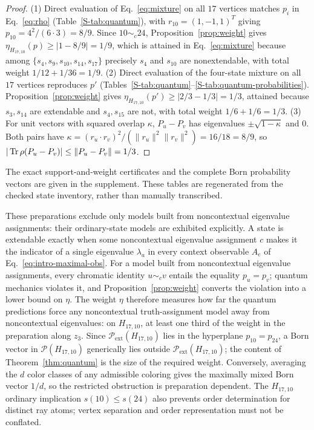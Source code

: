 \documentclass[aps,pra,reprint,superscriptaddress,longbibliography,nofootinbib,floatfix,10pt]{revtex4-2}
\theoremstyle{definition}\newtheorem{definition}[theorem]{Definition}
\theoremstyle{remark}\newtheorem{remark}[theorem]{Remark}
\begin{document}
\begin{proof}
(1) Direct evaluation of Eq.~\eqref{eq:mixture} on all $17$ vertices matches $p_i$ in Eq.~\eqref{eq:rho} (Table~\ref{S-tab:quantum}), with $r_{10}=(1,-1,1)^T$ giving $p_{10}=4^2/(6\cdot3)=8/9$. Since $10\sim_c 24$, Proposition~\ref{prop:weight} gives $\eta_{H_{17,10}}(p)\ge|1-8/9|=1/9$, which is attained in Eq.~\eqref{eq:mixture} because among $\{s_4,s_9,s_{10},s_{14},s_{17}\}$ precisely $s_4$ and $s_{10}$ are nonextendable, with total weight $1/12+1/36=1/9$. (2) Direct evaluation of the four-state mixture on all $17$ vertices reproduces $p'$ (Tables~\ref{S-tab:quantum}--\ref{S-tab:quantum-probabilities}). Proposition~\ref{prop:weight} gives $\eta_{H_{17,10}}(p')\ge|2/3-1/3|=1/3$, attained because $s_3,s_{14}$ are extendable and $s_4,s_{15}$ are not, with total weight $1/6+1/6=1/3$. (3) For unit vectors with squared overlap $\kappa$, $P_u-P_v$ has eigenvalues $\pm\sqrt{1-\kappa}$ and $0$. Both pairs have $\kappa=(r_u\cdot r_v)^2/(\|r_u\|^2\|r_v\|^2)=16/18=8/9$, so $|\operatorname{Tr}\rho(P_u-P_v)|\le\|P_u-P_v\|=1/3$.
\end{proof}

The exact support-and-weight certificates and the complete Born probability vectors are given in the supplement. These tables are regenerated from the checked state inventory, rather than manually transcribed.

These preparations exclude only models built from noncontextual eigenvalue assignments: their ordinary-state models are exhibited explicitly. A state is extendable exactly when some noncontextual eigenvalue assignment $c$ makes it the indicator of a single eigenvalue $\lambda_a$ in every context observable $A_e$ of Eq.~\eqref{eq:intro-maximal-obs}. For a model built from noncontextual eigenvalue assignments, every chromatic identity $u\sim_c v$ entails the equality $p_u=p_v$; quantum mechanics violates it, and Proposition~\ref{prop:weight} converts the violation into a lower bound on $\eta$. The weight $\eta$ therefore measures how far the quantum predictions force any noncontextual truth-assignment model away from noncontextual eigenvalues: on $H_{17,10}$, at least one third of the weight in the preparation along $z_3$. Since $\mathcal P_{\mathrm{ext}}(H_{17,10})$ lies in the hyperplane $p_{10}=p_{24}$, a Born vector in $\mathcal P(H_{17,10})$ generically lies outside $\mathcal P_{\mathrm{ext}}(H_{17,10})$; the content of Theorem~\ref{thm:quantum} is the size of the required weight. Conversely, averaging the $d$ color classes of any admissible coloring gives the maximally mixed Born vector $1/d$, so the restricted obstruction is preparation dependent. The $H_{17,10}$ ordinary implication $s(10)\le s(24)$ also prevents order determination for distinct ray atoms; vertex separation and order representation must not be conflated.
\end{document}
